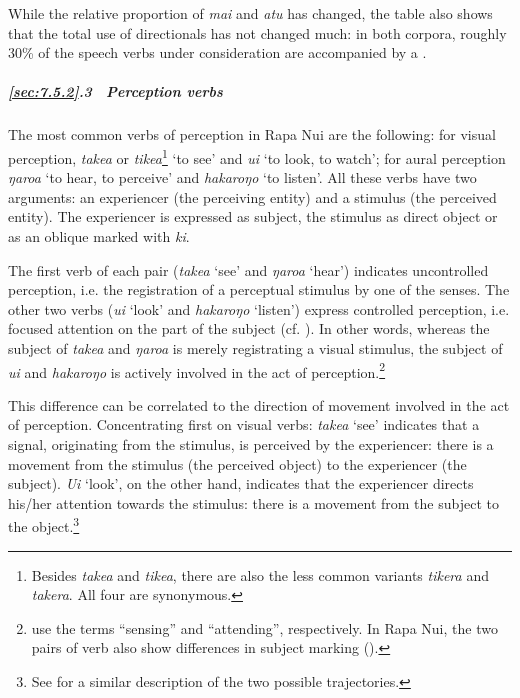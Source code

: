 While the relative proportion of \textit{mai} and \textit{atu} has changed, the table also shows that the total use of directionals has not changed much: in both corpora, roughly 30\% of the speech verbs under consideration are accompanied by a .

\subparagraph{\ref{sec:7.5.2}.3~ Perception verbs} The most common verbs of perception in Rapa Nui are the following: for visual perception, \textit{take{\ꞌ}a} or \textit{tike{\ꞌ}a}\footnote{\label{fn:363}Besides \textit{take{\ꞌ}a} and \textit{tike{\ꞌ}a}, there are also the less common variants \textit{tikera} and \textit{takera}. All four are synonymous.} ‘to see’ and \textit{u{\ꞌ}i} ‘to look, to watch’; for aural perception \textit{ŋaro{\ꞌ}a} ‘to hear, to perceive’ and \textit{hakaroŋo} ‘to listen’. All these verbs have two arguments: an experiencer (the perceiving entity) and a stimulus (the perceived entity). The experiencer is expressed as subject, the stimulus as direct object or as an oblique marked with \textit{ki}.

The first verb of each pair (\textit{take{\ꞌ}a} ‘see’ and \textit{ŋaro{\ꞌ}a} ‘hear’) indicates uncontrolled perception, i.e. the registration of a perceptual stimulus by one of the senses. The other two verbs (\textit{u{\ꞌ}i} ‘look’ and \textit{hakaroŋo} ‘listen’) express controlled perception, i.e. focused attention on the part of the subject (cf. \citealt[144]{Dixon2010-2}). In other words, whereas the subject of \textit{take{\ꞌ}a} and \textit{ŋaro{\ꞌ}a} is merely registrating a visual stimulus, the subject of \textit{u{\ꞌ}i} and \textit{hakaroŋo} is actively involved in the act of perception.\footnote{\label{fn:364}\citet{OsmondPawley2009} use the terms “sensing” and “attending”, respectively. In Rapa Nui, the two pairs of verb also show differences in subject marking ().}

This difference can be correlated to the direction of movement involved in the act of perception. Concentrating first on visual verbs: \textit{take{\ꞌ}a} ‘see’ indicates that a signal, originating from the stimulus, is perceived by the experiencer: there is a movement from the stimulus (the perceived object) to the experiencer (the subject). \textit{U{\ꞌ}i} ‘look’, on the other hand, indicates that the experiencer directs his/her attention towards the stimulus: there is a movement from the subject to the object.\footnote{\label{fn:365}See \citet[1745]{Hooper2004} for a similar description of the two possible trajectories.}

